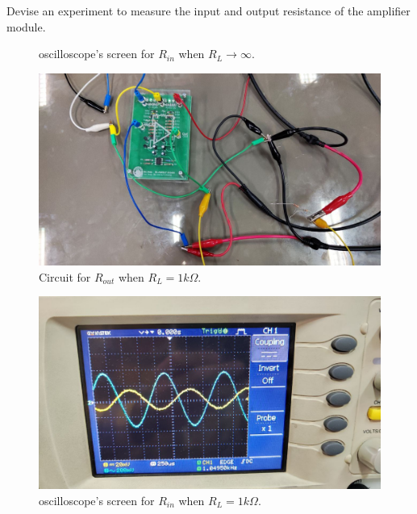 \documentclass[11pt]{article}
\newcommand{\PicScale}{0.2}
\begin{document}
\begin{question}
\begin{subquestion}{Devise an experiment to measure the input and output resistance of the amplifier module.}
{\begin{figure}[H]
                \caption{oscilloscope's screen for $R_{in}$ when $R_L \to \infty$.}
            \end{figure}
            \begin{figure}[H]
                \centering
                \includegraphics[scale=\PicScale,angle=0]{Fig/42.jpeg}
                \caption{Circuit for $R_{out}$ when $R_L = 1k\Omega$.}
            \end{figure}
            \begin{figure}[H]
                \centering
                \includegraphics[scale=\PicScale,angle=0]{Fig/43.jpeg}
                \caption{oscilloscope's screen for $R_{in}$ when $R_L = 1k\Omega$.}
            \end{figure}
        }
    \end{subquestion}


\end{question}
\end{document}
